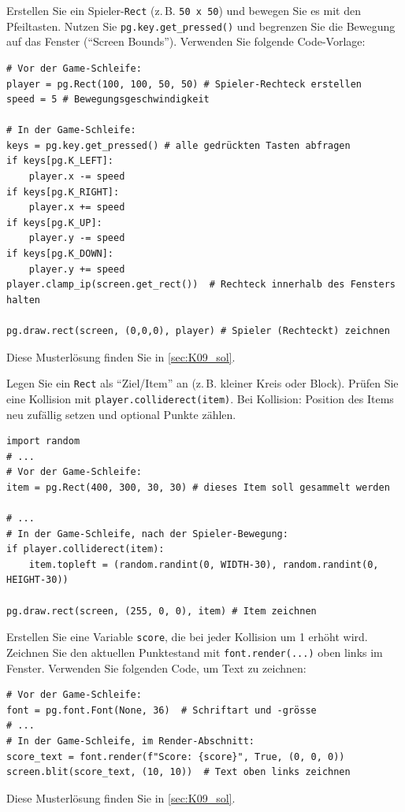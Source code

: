 \begin{myexercise}\label{myexercise:Bewegungen}
    Erstellen Sie ein Spieler-\lstinline|Rect| (z.\,B. \lstinline|50 x 50|) und bewegen Sie es mit den Pfeiltasten. Nutzen Sie \lstinline|pg.key.get_pressed()| und begrenzen Sie die Bewegung auf das Fenster (\enquote{Screen Bounds}). Verwenden Sie folgende Code-Vorlage:
    \begin{lstlisting}
# Vor der Game-Schleife:
player = pg.Rect(100, 100, 50, 50) # Spieler-Rechteck erstellen
speed = 5 # Bewegungsgeschwindigkeit

# In der Game-Schleife:
keys = pg.key.get_pressed() # alle gedrückten Tasten abfragen
if keys[pg.K_LEFT]:
	player.x -= speed
if keys[pg.K_RIGHT]:
	player.x += speed
if keys[pg.K_UP]:
	player.y -= speed
if keys[pg.K_DOWN]:
	player.y += speed
player.clamp_ip(screen.get_rect())  # Rechteck innerhalb des Fensters halten

pg.draw.rect(screen, (0,0,0), player) # Spieler (Rechteckt) zeichnen
\end{lstlisting}
	\begin{myanswer}
		Diese Musterlösung finden Sie in \cref{sec:K09_sol}.
	\end{myanswer}
\end{myexercise}

\begin{myexercise}[Kollisionen]\label{myexercise:Kollisionen}
    Legen Sie ein \lstinline|Rect| als \enquote{Ziel/Item} an (z.\,B. kleiner Kreis oder Block). Prüfen Sie eine Kollision mit \lstinline|player.colliderect(item)|. Bei Kollision: Position des Items neu zufällig setzen und optional Punkte zählen.
    \begin{lstlisting}
import random
# ...
# Vor der Game-Schleife:
item = pg.Rect(400, 300, 30, 30) # dieses Item soll gesammelt werden

# ...
# In der Game-Schleife, nach der Spieler-Bewegung:
if player.colliderect(item):
	item.topleft = (random.randint(0, WIDTH-30), random.randint(0, HEIGHT-30))

pg.draw.rect(screen, (255, 0, 0), item) # Item zeichnen
\end{lstlisting}
\end{myexercise}

\begin{myexercise}\label{myexercise:Highscore}
    Erstellen Sie eine Variable \lstinline|score|, die bei jeder Kollision um 1 erhöht wird. Zeichnen Sie den aktuellen Punktestand mit \lstinline|font.render(...)| oben links im Fenster. Verwenden Sie folgenden Code, um Text zu zeichnen:
    \begin{lstlisting}
# Vor der Game-Schleife:
font = pg.font.Font(None, 36)  # Schriftart und -grösse
# ...
# In der Game-Schleife, im Render-Abschnitt:
score_text = font.render(f"Score: {score}", True, (0, 0, 0))
screen.blit(score_text, (10, 10))  # Text oben links zeichnen
\end{lstlisting}
	\begin{myanswer}
		Diese Musterlösung finden Sie in \cref{sec:K09_sol}.
	\end{myanswer}
\end{myexercise}

